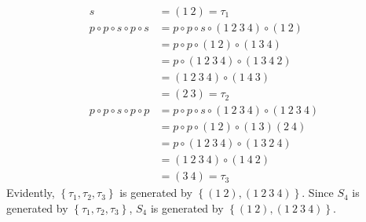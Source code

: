 \documentclass{article}
\begin{document}
\begin{equation}
    \begin{split}
        s & = \left(1~2\right) = \tau_1 \\
        p \circ p \circ s \circ p \circ s & = p \circ p \circ s \circ \left(1~2~3~4\right) \circ \left(1~2\right) \\
        & = p \circ p \circ \left(1~2\right) \circ \left(1~3~4\right) \\
        & = p \circ \left(1~2~3~4\right) \circ \left(1~3~4~2\right) \\
        & = \left(1~2~3~4\right) \circ \left(1~4~3\right) \\
        & = \left(2~3\right) = \tau_2 \\
        p \circ p \circ s \circ p \circ p & = p \circ p \circ s \circ \left(1~2~3~4\right) \circ \left(1~2~3~4\right) \\
        & = p \circ p \circ \left(1~2\right) \circ \left(1~3\right)\left(2~4\right) \\
        & = p \circ \left(1~2~3~4\right) \circ \left(1~3~2~4\right) \\
        & = \left(1~2~3~4\right) \circ \left(1~4~2\right) \\
        & = \left(3~4\right) = \tau_3
    \end{split}
\end{equation}
Evidently, $\left\{\tau_1, \tau_2, \tau_3\right\}$ is generated by $\left\{\left(1~2\right), \left(1~2~3~4\right)\right\}$. Since $S_4$ is generated by $\left\{\tau_1, \tau_2, \tau_3\right\}$, $S_4$ is generated by $\left\{\left(1~2\right), \left(1~2~3~4\right)\right\}$.

\clearpage
\end{document}

